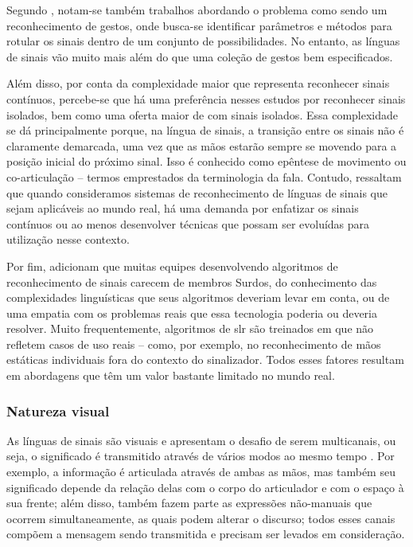 Segundo , notam-se também trabalhos abordando o problema como sendo um reconhecimento de gestos, onde busca-se identificar parâmetros e métodos para rotular os sinais dentro de um conjunto de possibilidades. No entanto, as línguas de sinais vão muito mais além do que uma coleção de gestos bem especificados.

Além disso, por conta da complexidade maior que representa reconhecer sinais contínuos, percebe-se que há uma preferência nesses estudos por reconhecer sinais isolados, bem como uma oferta maior de \datasets com sinais isolados. Essa complexidade se dá principalmente porque, na língua de sinais, a transição entre os sinais não é claramente demarcada, uma vez que as mãos estarão sempre se movendo para a posição inicial do próximo sinal. Isso é conhecido como epêntese de movimento ou co-articulação -- termos emprestados da terminologia da fala.
Contudo,  ressaltam que quando consideramos sistemas de reconhecimento de línguas de sinais que sejam aplicáveis ao mundo real, há uma demanda por enfatizar os sinais contínuos ou ao menos desenvolver técnicas que possam ser evoluídas para utilização nesse contexto.

Por fim,  adicionam que muitas equipes desenvolvendo algoritmos de reconhecimento de sinais carecem de membros Surdos, do conhecimento das complexidades linguísticas que seus algoritmos deveriam levar em conta, ou de uma empatia com os problemas reais que essa tecnologia poderia ou deveria resolver. 
Muito frequentemente, algoritmos de \acrshort{slr} são treinados em \datasets que não refletem casos de uso reais -- como, por exemplo, no reconhecimento de mãos estáticas individuais fora do contexto do sinalizador. Todos esses fatores resultam em abordagens que têm um valor bastante limitado no mundo real.



\subsubsection{Natureza visual}
\label{sec:slr-desafios-natureza-visual}

As línguas de sinais são visuais e apresentam o desafio de serem multicanais, ou seja, o significado é transmitido através de vários modos ao mesmo tempo \cite{cooper-2011-slr}. Por exemplo, a informação é articulada através de ambas as mãos, mas também seu significado depende da relação delas com o corpo do articulador e com o espaço à sua frente; além disso, também fazem parte as expressões não-manuais que ocorrem simultaneamente, as quais podem alterar o discurso; todos esses canais compõem a mensagem sendo transmitida e precisam ser levados em consideração.

